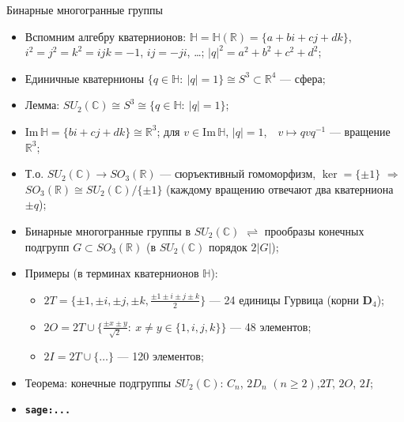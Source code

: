 \documentclass[serif, aspectratio=169]{beamer}
\newcommand{\sagemark}{%
  \textcolor{green!40!black}{\textbf{\texttt{sage:...}}}%
}
\begin{document}
\begin{frame}{Бинарные многогранные группы}
    \begin{itemize}
        \item Вспомним алгебру кватернионов: $\mathbb{H}=\mathbb{H}(\mathbb{R})=\{a+bi+cj+dk\}$, $i^2=j^2=k^2=ijk=-1$, $ij=-ji$, \dots; $|q|^2=a^2+b^2+c^2+d^2$;
        \item Единичные кватернионы $\{q\in\mathbb{H}:\ |q|=1\}\cong S^3\subset\mathbb{R}^4$ --- сфера;
        \item Лемма: $SU_2(\mathbb{C})\cong S^3\cong\{q\in\mathbb{H}:\ |q|=1\}$;
        \item $\mathrm{Im}\,\mathbb{H}=\{bi+cj+dk\}\cong\mathbb{R}^3$; для $v\in\mathrm{Im}\,\mathbb{H}$, $|q|=1$,\ \  $v\mapsto q v q^{-1}$ --- вращение $\mathbb{R}^3$;
        \item Т.о. $SU_2(\mathbb{C})\to SO_3(\mathbb{R})$ --- сюръективный гомоморфизм, $\ker=\{\pm1\}$ $\Rightarrow$ $SO_3(\mathbb{R})\cong SU_2(\mathbb{C})/\{\pm1\}$ (каждому вращению отвечают два кватерниона $\pm q$);
        \item Бинарные многогранные группы в $SU_2(\mathbb{C})$ $\rightleftharpoons$ прообразы конечных подгрупп $G\subset SO_3(\mathbb{R})$ (в $SU_2(\mathbb{C})$ порядок $2|G|$);
        \item Примеры (в терминах кватернионов $\mathbb{H}$): 
        \begin{itemize}
            \item $2T=\{\pm1,\pm i,\pm j,\pm k,\tfrac{\pm1\pm i\pm j\pm k}{2}\}$ --- 24 единицы Гурвица (корни $\mathbf{D}_4$);
            \item $2O=2T\cup\{\tfrac{\pm x\pm y}{\sqrt2}:\ x\ne y\in\{1,i,j,k\}\}$ --- 48 элементов;
            \item $2I=2T\cup\{\dots\}$ --- 120 элементов;
        \end{itemize}
        \item Теорема: конечные подгруппы $SU_2(\mathbb{C})$: $C_n$, $2D_n$ $(n\ge2)$,\quad $2T$, $2O$, $2I$;
        \item \sagemark
    \end{itemize}
\end{frame}
\end{document}
